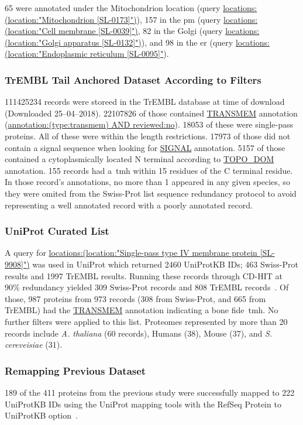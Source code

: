 65 were annotated under the Mitochondrion location (query \url{locations:(location:"Mitochondrion [SL-0173]")}), 157 in the \gls{pm} (query \url{locations:(location:"Cell membrane [SL-0039]")}, 82 in the Golgi (query \url{locations:(location:"Golgi apparatus [SL-0132]")}), and 98 in the \gls{er} (query \url{locations:(location:"Endoplasmic reticulum [SL-0095]"}).

\subsubsection{TrEMBL Tail Anchored Dataset According to Filters}
111425234 records were storeed in the TrEMBL database at time of download (Downloaded 25--04--2018).
22107826 of those contained \url{TRANSMEM} annotation (\url{annotation:(type:transmem) AND reviewed:no}).
18053 of these were single-pass proteins.
All of these were within the length restrictions.
17973 of those did not contain a signal sequence when looking for \url{SIGNAL} annotation.
5157 of those contained a cytoplasmically located N terminal according to \url{TOPO_DOM} annotation.
155 records had a~\gls{tmh} within 15 residues of the C terminal residue.
In those record's annotations, no more than 1 appeared in any given species, so they were omited from the Swiss-Prot list sequence redundancy protocol to avoid representing a well annotated record with a poorly annotated record.

\subsubsection{UniProt Curated List}
A query for \url{locations:(location:"Single-pass type IV membrane protein [SL-9908]")} was used in UniProt which returned 2460 UniProtKB IDs; 463 Swiss-Prot results and 1997 TrEMBL results.
Running these records through CD-HIT at 90\% redundancy yielded 309 Swiss-Prot records and 808 TrEMBL records~\cite{Huang2010, Wu2011}.
Of those, 987 proteins from 973 records (308 from Swiss-Prot, and 665 from TrEMBL) had the \url{TRANSMEM} annotation indicating a bone fide~\gls{tmh}.
No further filters were applied to this list.
Proteomes represented by more than 20 records include \textit{A. thaliana} (60 records), Humans (38), Mouse (37), and \textit{S. cereveisiae} (31). %

\subsubsection{Remapping Previous Dataset}
189 of the 411 proteins from the previous study were successfully mapped to 222 UniProtKB IDs using the UniProt mapping tools with the RefSeq Protein to UniProtKB option~\cite{TheUniProtConsortium2014}.

